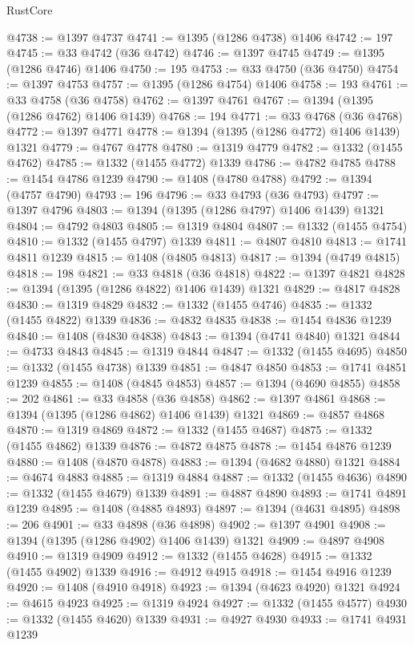 \begin{lexlean}{RustCore}
\begin{coremodule}
@4738 := @1397 @4737
@4741 := @1395 (@1286 @4738) @1406
@4742 := 197
@4745 := @33 @4742 (@36 @4742)
@4746 := @1397 @4745
@4749 := @1395 (@1286 @4746) @1406
@4750 := 195
@4753 := @33 @4750 (@36 @4750)
@4754 := @1397 @4753
@4757 := @1395 (@1286 @4754) @1406
@4758 := 193
@4761 := @33 @4758 (@36 @4758)
@4762 := @1397 @4761
@4767 := @1394 (@1395 (@1286 @4762) @1406 @1439)
@4768 := 194
@4771 := @33 @4768 (@36 @4768)
@4772 := @1397 @4771
@4778 := @1394 (@1395 (@1286 @4772) @1406 @1439) @1321
@4779 := @4767 @4778
@4780 := @1319 @4779
@4782 := @1332 (@1455 @4762)
@4785 := @1332 (@1455 @4772) @1339
@4786 := @4782 @4785
@4788 := @1454 @4786 @1239
@4790 := @1408 (@4780 @4788)
@4792 := @1394 (@4757 @4790)
@4793 := 196
@4796 := @33 @4793 (@36 @4793)
@4797 := @1397 @4796
@4803 := @1394 (@1395 (@1286 @4797) @1406 @1439) @1321
@4804 := @4792 @4803
@4805 := @1319 @4804
@4807 := @1332 (@1455 @4754)
@4810 := @1332 (@1455 @4797) @1339
@4811 := @4807 @4810
@4813 := @1741 @4811 @1239
@4815 := @1408 (@4805 @4813)
@4817 := @1394 (@4749 @4815)
@4818 := 198
@4821 := @33 @4818 (@36 @4818)
@4822 := @1397 @4821
@4828 := @1394 (@1395 (@1286 @4822) @1406 @1439) @1321
@4829 := @4817 @4828
@4830 := @1319 @4829
@4832 := @1332 (@1455 @4746)
@4835 := @1332 (@1455 @4822) @1339
@4836 := @4832 @4835
@4838 := @1454 @4836 @1239
@4840 := @1408 (@4830 @4838)
@4843 := @1394 (@4741 @4840) @1321
@4844 := @4733 @4843
@4845 := @1319 @4844
@4847 := @1332 (@1455 @4695)
@4850 := @1332 (@1455 @4738) @1339
@4851 := @4847 @4850
@4853 := @1741 @4851 @1239
@4855 := @1408 (@4845 @4853)
@4857 := @1394 (@4690 @4855)
@4858 := 202
@4861 := @33 @4858 (@36 @4858)
@4862 := @1397 @4861
@4868 := @1394 (@1395 (@1286 @4862) @1406 @1439) @1321
@4869 := @4857 @4868
@4870 := @1319 @4869
@4872 := @1332 (@1455 @4687)
@4875 := @1332 (@1455 @4862) @1339
@4876 := @4872 @4875
@4878 := @1454 @4876 @1239
@4880 := @1408 (@4870 @4878)
@4883 := @1394 (@4682 @4880) @1321
@4884 := @4674 @4883
@4885 := @1319 @4884
@4887 := @1332 (@1455 @4636)
@4890 := @1332 (@1455 @4679) @1339
@4891 := @4887 @4890
@4893 := @1741 @4891 @1239
@4895 := @1408 (@4885 @4893)
@4897 := @1394 (@4631 @4895)
@4898 := 206
@4901 := @33 @4898 (@36 @4898)
@4902 := @1397 @4901
@4908 := @1394 (@1395 (@1286 @4902) @1406 @1439) @1321
@4909 := @4897 @4908
@4910 := @1319 @4909
@4912 := @1332 (@1455 @4628)
@4915 := @1332 (@1455 @4902) @1339
@4916 := @4912 @4915
@4918 := @1454 @4916 @1239
@4920 := @1408 (@4910 @4918)
@4923 := @1394 (@4623 @4920) @1321
@4924 := @4615 @4923
@4925 := @1319 @4924
@4927 := @1332 (@1455 @4577)
@4930 := @1332 (@1455 @4620) @1339
@4931 := @4927 @4930
@4933 := @1741 @4931 @1239

\end{coremodule}
\end{lexlean}
